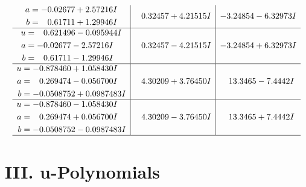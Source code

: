\documentclass[1p]{elsarticle_modified}
\theoremstyle{definition}
\begin{document}
$$\begin{array}{c|c|c}
\begin{aligned}
a &= -0.02677 + 2.57216 I \\
b &= \phantom{-}0.61711 + 1.29946 I\end{aligned}
 & \phantom{-}0.32457 + 4.21515 I & -3.24854 - 6.32973 I \\ \hline\begin{aligned}
u &= \phantom{-}0.621496 - 0.095944 I \\
a &= -0.02677 - 2.57216 I \\
b &= \phantom{-}0.61711 - 1.29946 I\end{aligned}
 & \phantom{-}0.32457 - 4.21515 I & -3.24854 + 6.32973 I \\ \hline\begin{aligned}
u &= -0.878460 + 1.058430 I \\
a &= \phantom{-}0.269474 - 0.056700 I \\
b &= -0.0508752 + 0.0987483 I\end{aligned}
 & \phantom{-}4.30209 + 3.76450 I & \phantom{-}13.3465 - 7.4442 I \\ \hline\begin{aligned}
u &= -0.878460 - 1.058430 I \\
a &= \phantom{-}0.269474 + 0.056700 I \\
b &= -0.0508752 - 0.0987483 I\end{aligned}
 & \phantom{-}4.30209 - 3.76450 I & \phantom{-}13.3465 + 7.4442 I\\
 \hline 
 \end{array}$$\newpage
\newpage\renewcommand{\arraystretch}{1}
\centering \section*{ III. u-Polynomials}
\end{document}
